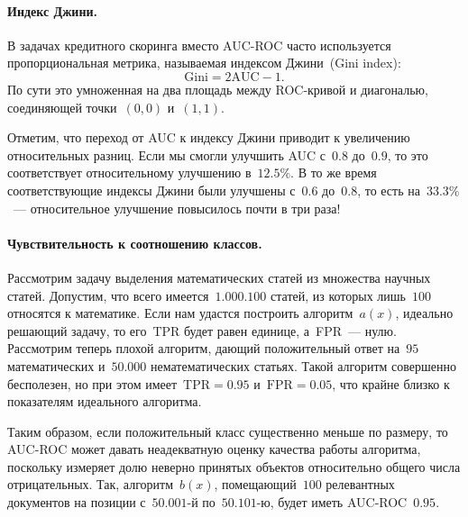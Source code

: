 \documentclass[12pt,fleqn]{article}
\begin{document}
\paragraph{Индекс Джини.}
В задачах кредитного скоринга вместо AUC-ROC часто используется пропорциональная
метрика, называемая индексом Джини~(Gini index):
\[
    \text{Gini}
    =
    2 \text{AUC} - 1.
\]
По сути это умноженная на два площадь между ROC-кривой и диагональю, соединяющей точки~$(0, 0)$ и~$(1, 1)$.

Отметим, что переход от AUC к индексу Джини приводит к увеличению относительных разниц.
Если мы смогли улучшить AUC с~$0.8$ до~$0.9$, то это соответствует
относительному улучшению в~$12.5\%$.
В то же время соответствующие индексы Джини были улучшены с~$0.6$ до~$0.8$,
то есть на~$33.3\%$~--- относительное улучшение повысилось почти в три раза!

\paragraph{Чувствительность к соотношению классов.}
Рассмотрим задачу выделения математических статей из множества научных статей.
Допустим, что всего имеется~$1.000.100$ статей, из которых лишь~$100$ относятся к математике.
Если нам удастся построить алгоритм~$a(x)$, идеально решающий задачу,
то его~TPR будет равен единице, а~FPR~--- нулю.
Рассмотрим теперь плохой алгоритм, дающий положительный ответ на~$95$ математических
и~$50.000$ нематематических статьях.
Такой алгоритм совершенно бесполезен, но при этом имеет~$\text{TPR} = 0.95$
и~$\text{FPR} = 0.05$, что крайне близко к показателям идеального алгоритма.

Таким образом, если положительный класс существенно меньше по размеру,
то AUC-ROC может давать неадекватную оценку качества работы алгоритма,
поскольку измеряет долю неверно принятых объектов относительно
общего числа отрицательных.
Так, алгоритм~$b(x)$, помещающий~$100$ релевантных документов
на позиции с~$50.001$-й по~$50.101$-ю, будет иметь AUC-ROC~$0.95$.
\end{document}
